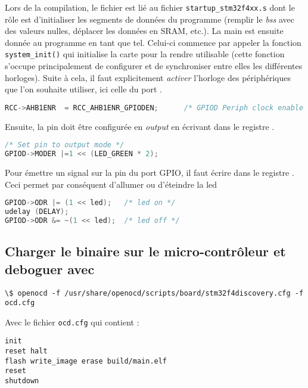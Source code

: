 \documentclass{FicheLecture}
\begin{document}
Lors de la compilation, le fichier est lié au fichier \texttt{startup\_stm32f4xx.s} dont le rôle est d'initialiser les segments de données du programme (remplir le \emph{bss} avec des valeurs nulles, déplacer les données en SRAM, etc.). La main est ensuite donnée au programme en tant que tel. Celui-ci commence par appeler la fonction \texttt{system\_init()} qui initialise la carte pour la rendre utilisable (cette fonction s'occupe principalement de configurer et de synchroniser entre elles les différentes horloges). Suite à cela, il faut explicitement \emph{activer} l'horloge des périphériques que l'on souhaite utiliser, ici celle du port . 

\begin{lstlisting}[language=C]
RCC->AHB1ENR  = RCC_AHB1ENR_GPIODEN;      /* GPIOD Periph clock enable */
\end{lstlisting}

Ensuite, la pin doit être configurée en \emph{output} en écrivant dans le registre . 

\begin{lstlisting}[language=C]
/* Set pin to output mode */
GPIOD->MODER |=1 << (LED_GREEN * 2);
\end{lstlisting}

Pour émettre un signal sur la pin du port GPIO, il faut écrire dans le registre .
Ceci permet par conséquent d'allumer ou d'éteindre la led

\begin{lstlisting}[language=C]
GPIOD->ODR |= (1 << led);   /* led on */
udelay (DELAY);
GPIOD->ODR &= ~(1 << led);  /* led off */
\end{lstlisting}

\subsection{Charger le binaire sur le micro-contrôleur et deboguer avec }

\begin{lstlisting}
\$ openocd -f /usr/share/openocd/scripts/board/stm32f4discovery.cfg -f ocd.cfg
\end{lstlisting}

Avec le fichier \texttt{ocd.cfg} qui contient :

\begin{lstlisting}
init
reset halt
flash write_image erase build/main.elf 
reset 
shutdown
\end{lstlisting}
\end{document}
